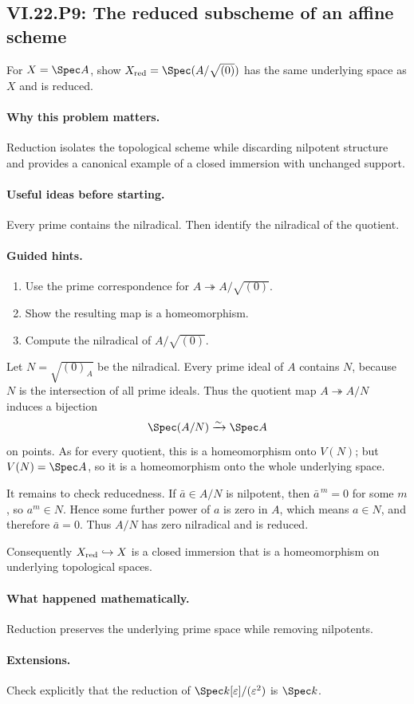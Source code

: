 \subsection*{VI.22.P9: The reduced subscheme of an affine scheme}
\begin{problem}\label{prob:vi22-p09}
For $X=\Spec A$, show $X_{\rm red}=\Spec(A/\sqrt{(0)})$ has the same underlying space as $X$ and is reduced.
\end{problem}

\ifdefined\FullProblemDossiers
\paragraph{Why this problem matters.}
Reduction isolates the topological scheme while discarding nilpotent structure and provides a canonical example of a closed immersion with unchanged support.

\paragraph{Useful ideas before starting.}
Every prime contains the nilradical.  Then identify the nilradical of the quotient.

\paragraph{Guided hints.}
\begin{enumerate}
\item Use the prime correspondence for $A\twoheadrightarrow A/\sqrt{(0)}$.
\item Show the resulting map is a homeomorphism.
\item Compute the nilradical of $A/\sqrt{(0)}$.
\end{enumerate}

\begin{solution}
Let $N=\sqrt{(0)_A}$ be the nilradical.  Every prime ideal of $A$ contains
$N$, because $N$ is the intersection of all prime ideals.  Thus the quotient map
$A\twoheadrightarrow A/N$ induces a bijection
\[
 \Spec(A/N)\xrightarrow{\sim}\Spec A
\]
on points.  As for every quotient, this is a homeomorphism onto $V(N)$; but
$V(N)=\Spec A$, so it is a homeomorphism onto the whole underlying space.

It remains to check reducedness.  If $\bar a\in A/N$ is nilpotent, then
$\bar a^{\,m}=0$ for some $m$, so $a^m\in N$.  Hence some further power of $a$ is zero in
$A$, which means $a\in N$, and therefore $\bar a=0$.  Thus $A/N$ has zero nilradical and is
reduced.

Consequently $X_{\rm red}\hookrightarrow X$ is a closed immersion that is a homeomorphism on
underlying topological spaces.
\end{solution}

\paragraph{What happened mathematically.}
Reduction preserves the underlying prime space while removing nilpotents.

\paragraph{Extensions.}
Check explicitly that the reduction of $\Spec k[\varepsilon]/(\varepsilon^2)$ is $\Spec k$.
\fi
